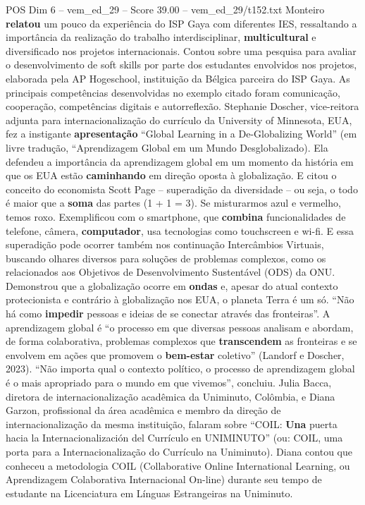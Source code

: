 \begin{textsample}{POS Dim 6 – vem\_ed\_29 – Score 39.00 – vem\_ed\_29/t152.txt}
Monteiro \textbf{relatou} um pouco da experiência do ISP Gaya com diferentes IES, ressaltando a importância da realização do trabalho interdisciplinar, \textbf{multicultural} e diversificado nos projetos internacionais.
Contou sobre uma pesquisa para avaliar o desenvolvimento de soft skills por parte dos estudantes envolvidos nos projetos, elaborada pela AP Hogeschool, instituição da Bélgica parceira do ISP Gaya.
As principais competências desenvolvidas no exemplo citado foram comunicação, cooperação, competências digitais e autorreflexão.
Stephanie Doscher, vice-reitora adjunta para internacionalização do currículo da University of Minnesota, EUA, fez a instigante \textbf{apresentação} “Global Learning in a De-Globalizing World” (em livre tradução, “Aprendizagem Global em um Mundo Desglobalizado).
Ela defendeu a importância da aprendizagem global em um momento da história em que os EUA estão \textbf{caminhando} em direção oposta à globalização.
E citou o conceito do economista Scott Page – superadição da diversidade – ou seja, o todo é maior que a \textbf{soma} das partes (1 + 1 = 3).
Se misturarmos azul e vermelho, temos roxo.
Exemplificou com o smartphone, que \textbf{combina} funcionalidades de telefone, câmera, \textbf{computador}, usa tecnologias como touchscreen e wi-fi.
E essa superadição pode ocorrer também nos continuação Intercâmbios Virtuais, buscando olhares diversos para soluções de problemas complexos, como os relacionados aos Objetivos de Desenvolvimento Sustentável (ODS) da ONU.
Demonstrou que a globalização ocorre em \textbf{ondas} e, apesar do atual contexto protecionista e contrário à globalização nos EUA, o planeta Terra é um só. “Não há como \textbf{impedir} pessoas e ideias de se conectar através das fronteiras”.
A aprendizagem global é “o processo em que diversas pessoas analisam e abordam, de forma colaborativa, problemas complexos que \textbf{transcendem} as fronteiras e se envolvem em ações que promovem o \textbf{bem-estar} coletivo” (Landorf e Doscher, 2023). “Não importa qual o contexto político, o processo de aprendizagem global é o mais apropriado para o mundo em que vivemos”, concluiu.
Julia Bacca, diretora de internacionalização acadêmica da Uniminuto, Colômbia, e Diana Garzon, profissional da área acadêmica e membro da direção de internacionalização da mesma instituição, falaram sobre “COIL: \textbf{Una} puerta hacia la Internacionalización del Currículo en UNIMINUTO” (ou: COIL, uma porta para a Internacionalização do Currículo na Uniminuto).
Diana contou que conheceu a metodologia COIL (Collaborative Online International Learning, ou Aprendizagem Colaborativa Internacional On-line) durante seu tempo de estudante na Licenciatura em Línguas Estrangeiras na Uniminuto.

\end{textsample}
